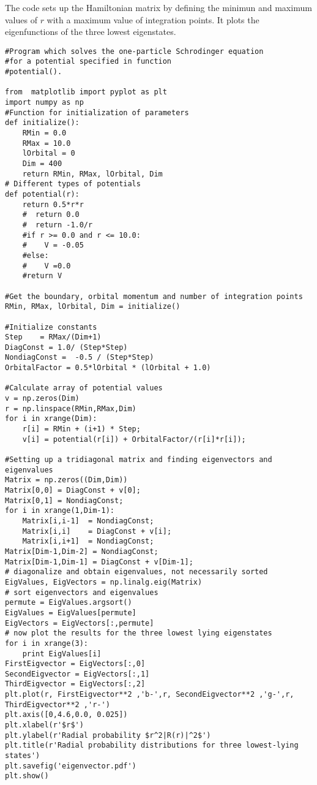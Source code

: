 \documentclass[graybox,envcountchap,sectrefs]{svmult}
\begin{document}
The code sets up the Hamiltonian matrix by defining the minimun and maximum values of $r$ with a
maximum value of integration points. It plots the
eigenfunctions of the three lowest eigenstates.
\begin{lstlisting}
#Program which solves the one-particle Schrodinger equation
#for a potential specified in function
#potential().

from  matplotlib import pyplot as plt
import numpy as np
#Function for initialization of parameters
def initialize():
    RMin = 0.0
    RMax = 10.0
    lOrbital = 0
    Dim = 400
    return RMin, RMax, lOrbital, Dim
# Different types of potentials
def potential(r):
    return 0.5*r*r
    #  return 0.0
    #  return -1.0/r
    #if r >= 0.0 and r <= 10.0:
    #    V = -0.05
    #else:
    #    V =0.0
    #return V

#Get the boundary, orbital momentum and number of integration points
RMin, RMax, lOrbital, Dim = initialize()

#Initialize constants
Step    = RMax/(Dim+1)
DiagConst = 1.0/ (Step*Step)
NondiagConst =  -0.5 / (Step*Step)
OrbitalFactor = 0.5*lOrbital * (lOrbital + 1.0)

#Calculate array of potential values
v = np.zeros(Dim)
r = np.linspace(RMin,RMax,Dim)
for i in xrange(Dim):
    r[i] = RMin + (i+1) * Step;
    v[i] = potential(r[i]) + OrbitalFactor/(r[i]*r[i]);

#Setting up a tridiagonal matrix and finding eigenvectors and eigenvalues
Matrix = np.zeros((Dim,Dim))
Matrix[0,0] = DiagConst + v[0];
Matrix[0,1] = NondiagConst;
for i in xrange(1,Dim-1):
    Matrix[i,i-1]  = NondiagConst;
    Matrix[i,i]    = DiagConst + v[i];
    Matrix[i,i+1]  = NondiagConst;
Matrix[Dim-1,Dim-2] = NondiagConst;
Matrix[Dim-1,Dim-1] = DiagConst + v[Dim-1];
# diagonalize and obtain eigenvalues, not necessarily sorted
EigValues, EigVectors = np.linalg.eig(Matrix)
# sort eigenvectors and eigenvalues
permute = EigValues.argsort()
EigValues = EigValues[permute]
EigVectors = EigVectors[:,permute]
# now plot the results for the three lowest lying eigenstates
for i in xrange(3):
    print EigValues[i]
FirstEigvector = EigVectors[:,0]
SecondEigvector = EigVectors[:,1]
ThirdEigvector = EigVectors[:,2]
plt.plot(r, FirstEigvector**2 ,'b-',r, SecondEigvector**2 ,'g-',r, ThirdEigvector**2 ,'r-')
plt.axis([0,4.6,0.0, 0.025])
plt.xlabel(r'$r$')
plt.ylabel(r'Radial probability $r^2|R(r)|^2$')
plt.title(r'Radial probability distributions for three lowest-lying states')
plt.savefig('eigenvector.pdf')
plt.show()
\end{lstlisting}
\end{document}
